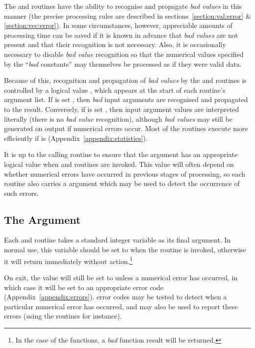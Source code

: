 The  and  routines have the ability to recognise
and propagate {\em bad values} in this manner (the precise processing rules
are described in sections~\ref{section:val:error} \& \ref{section:vec:error}).
In some circumstances, however, appreciable amounts of processing time can
be saved if it is known in advance that {\em bad values} are not present and
that their recognition is not necessary.
Also, it is occasionally necessary to disable {\em bad value} recognition so
that the numerical values specified by the ``{\em bad} constants'' may
themselves be processed as if they were valid data.

Because of this, recognition and propagation of {\em bad values} by the
 and  routines is controlled by a logical value
, which appears at the start of each routine's argument list.
If  is set , then {\em bad} input arguments are
recognised and propagated to the result.
Conversely, if  is set , then input argument
values are interpreted literally (there is no {\em bad value} recognition),
although {\em bad values} may still be generated on output if numerical
errors occur.
Most of the routines execute more efficiently if  is
 (Appendix~\ref{appendix:statistics}).

It is up to the calling routine to ensure that the  argument
has an appropriate logical value when  and  routines
are invoked.
This value will often depend on whether numerical errors have occurred in
previous stages of processing, so each routine also carries a
 argument which may be used to detect the occurrence of such
errors.

\subsection{The  Argument}

Each  and  routine takes a standard
integer  variable as its final argument.
In normal use, this  variable should be set to
 when the routine is invoked, otherwise it will return
immediately without action.\footnote{
In the case of the  functions, a {\em bad} function result will
be returned.}

On exit, the  value will still be set to 
unless a numerical error has occurred, in which case it will be set to an
appropriate error code (Appendix~\ref{appendix:errors}).
 error codes may be tested to detect when a particular
numerical error has occurred, and may also be used to report these errors
(using the   routines for instance).

